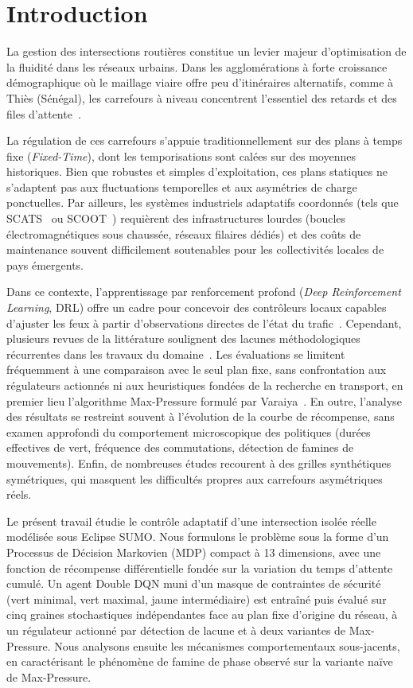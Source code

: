 \documentclass[11pt,a4paper]{article}
\begin{document}
\section{Introduction}
\label{sec:intro}

La gestion des intersections routières constitue un levier majeur d'optimisation de la fluidité dans les réseaux urbains. Dans les agglomérations à forte croissance démographique où le maillage viaire offre peu d'itinéraires alternatifs, comme à Thiès (Sénégal), les carrefours à niveau concentrent l'essentiel des retards et des files d'attente~\cite{haydari2022deep}.

La régulation de ces carrefours s'appuie traditionnellement sur des plans à temps fixe (\emph{Fixed-Time}), dont les temporisations sont calées sur des moyennes historiques. Bien que robustes et simples d'exploitation, ces plans statiques ne s'adaptent pas aux fluctuations temporelles et aux asymétries de charge ponctuelles. Par ailleurs, les systèmes industriels adaptatifs coordonnés (tels que SCATS~\cite{lowrie1990scats} ou SCOOT~\cite{hunt1981scoot}) requièrent des infrastructures lourdes (boucles électromagnétiques sous chaussée, réseaux filaires dédiés) et des coûts de maintenance souvent difficilement soutenables pour les collectivités locales de pays émergents.

Dans ce contexte, l'apprentissage par renforcement profond (\emph{Deep Reinforcement Learning}, DRL) offre un cadre pour concevoir des contrôleurs locaux capables d'ajuster les feux à partir d'observations directes de l'état du trafic~\cite{wei2018intellilight,wei2019presslight,chen2020toward,zhang2020pdlight}. Cependant, plusieurs revues de la littérature soulignent des lacunes méthodologiques récurrentes dans les travaux du domaine~\cite{wei2021survey,zhao2024survey}. Les évaluations se limitent fréquemment à une comparaison avec le seul plan fixe, sans confrontation aux régulateurs actionnés ni aux heuristiques fondées de la recherche en transport, en premier lieu l'algorithme Max-Pressure formulé par Varaiya~\cite{varaiya2013max}. En outre, l'analyse des résultats se restreint souvent à l'évolution de la courbe de récompense, sans examen approfondi du comportement microscopique des politiques (durées effectives de vert, fréquence des commutations, détection de famines de mouvements). Enfin, de nombreuses études recourent à des grilles synthétiques symétriques, qui masquent les difficultés propres aux carrefours asymétriques réels.

Le présent travail étudie le contrôle adaptatif d'une intersection isolée réelle modélisée sous Eclipse SUMO. Nous formulons le problème sous la forme d'un Processus de Décision Markovien (MDP) compact à 13 dimensions, avec une fonction de récompense différentielle fondée sur la variation du temps d'attente cumulé. Un agent Double DQN muni d'un masque de contraintes de sécurité (vert minimal, vert maximal, jaune intermédiaire) est entraîné puis évalué sur cinq graines stochastiques indépendantes face au plan fixe d'origine du réseau, à un régulateur actionné par détection de lacune et à deux variantes de Max-Pressure. Nous analysons ensuite les mécanismes comportementaux sous-jacents, en caractérisant le phénomène de famine de phase observé sur la variante naïve de Max-Pressure.
\end{document}
